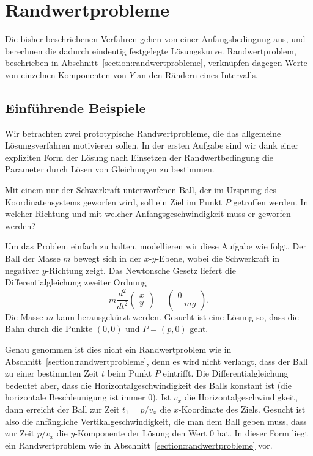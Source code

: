 %
%
%
\section{Randwertprobleme\label{section:numerik:randwertprobleme}}
Die bisher beschriebenen Verfahren gehen von einer Anfangsbedingung
aus, und berechnen die dadurch eindeutig festgelegte Lösungskurve.
Randwertproblem, beschrieben in Abschnitt~\ref{section:randwertprobleme},
verknüpfen dagegen Werte von einzelnen Komponenten von $Y$ an den
Rändern eines Intervalls.
%

\subsection{Einführende Beispiele}
Wir betrachten zwei prototypische Randwertprobleme, die das allgemeine
Lösungsverfahren motivieren sollen.
In der ersten Aufgabe sind wir dank einer expliziten Form der Lösung
nach Einsetzen der Randwertbedingung die Parameter durch Lösen
von Gleichungen zu bestimmen.

\begin{aufgabe}
\label{numerik:aufgabe-ball}
Mit einem nur der Schwerkraft unterworfenen Ball, der im Ursprung des
Koordinatensystems geworfen wird, soll ein Ziel im Punkt $P$ getroffen
werden.
In welcher Richtung und mit welcher Anfangsgeschwindigkeit muss er geworfen
werden?
\end{aufgabe}

Um das Problem einfach zu halten, modellieren wir diese Aufgabe wie
folgt.
Der Ball der Masse $m$ bewegt sich in der $x$-$y$-Ebene, wobei die
Schwerkraft in negativer $y$-Richtung zeigt.
Das Newtonsche Gesetz liefert die Differentialgleichung zweiter Ordnung
\begin{equation}
m\frac{d^2}{dt^2}\begin{pmatrix}x\\y\end{pmatrix}
=
\begin{pmatrix}
0\\-mg
\end{pmatrix}.
\label{numerik:ball-dgl}
\end{equation}
Die Masse $m$ kann herausgekürzt werden.
Gesucht ist eine Lösung so, dass die Bahn durch die Punkte $(0,0)$
und $P=(p,0)$ geht.

Genau genommen ist dies nicht ein Randwertproblem wie in 
Abschnitt~\ref{section:randwertprobleme}, denn es wird nicht verlangt,
dass der Ball zu einer bestimmten Zeit $t$ beim Punkt $P$ eintrifft.
Die Differentialgleichung bedeutet aber, dass die Horizontalgeschwindigkeit
des Balls konstant ist (die horizontale Beschleunigung ist immer $0$).
Ist $v_x$ die Horizontalgeschwindigkeit, dann erreicht der Ball zur
Zeit $t_1=p/v_x$ die $x$-Koordinate des Ziels.
Gesucht ist also die anfängliche Vertikalgeschwindigkeit, die man
dem Ball geben muss, dass zur Zeit $p/v_x$ die $y$-Komponente
der Lösung den Wert $0$ hat.
In dieser Form liegt ein Randwertproblem wie in
Abschnitt~\ref{section:randwertprobleme} vor.

